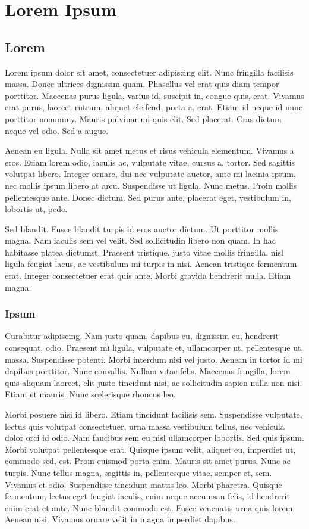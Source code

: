 \chapter{Lorem Ipsum}

\section{Lorem}

Lorem ipsum dolor sit amet, consectetuer adipiscing elit. Nunc fringilla facilisis massa. Donec
ultrices dignissim quam. Phasellus vel erat quis diam tempor porttitor. Maecenas purus ligula,
varius id, suscipit in, congue quis, erat. Vivamus erat purus, laoreet rutrum, aliquet eleifend,
porta a, erat. Etiam id neque id nunc porttitor nonummy. Mauris pulvinar mi quis elit. Sed placerat.
Cras dictum neque vel odio. Sed a augue.

Aenean eu ligula. Nulla sit amet metus et risus vehicula elementum. Vivamus a eros. Etiam lorem
odio, iaculis ac, vulputate vitae, cursus a, tortor. Sed sagittis volutpat libero. Integer ornare,
dui nec vulputate auctor, ante mi lacinia ipsum, nec mollis ipsum libero at arcu. Suspendisse ut
ligula. Nunc metus. Proin mollis pellentesque ante. Donec dictum. Sed purus ante, placerat eget,
vestibulum in, lobortis ut, pede.

Sed blandit. Fusce blandit turpis id eros auctor dictum. Ut porttitor mollis magna. Nam iaculis sem
vel velit. Sed sollicitudin libero non quam. In hac habitasse platea dictumst. Praesent tristique,
justo vitae mollis fringilla, nisl ligula feugiat lacus, ac vestibulum mi turpis in nisi. Aenean
tristique fermentum erat. Integer consectetuer erat quis ante. Morbi gravida hendrerit nulla. Etiam
magna.

\subsection{Ipsum}

Curabitur adipiscing. Nam justo quam, dapibus eu, dignissim eu, hendrerit consequat, odio. Praesent
mi ligula, vulputate et, ullamcorper ut, pellentesque ut, massa. Suspendisse potenti. Morbi interdum
nisi vel justo. Aenean in tortor id mi dapibus porttitor. Nunc convallis. Nullam vitae felis.
Maecenas fringilla, lorem quis aliquam laoreet, elit justo tincidunt nisi, ac sollicitudin sapien
nulla non nisi. Etiam et mauris. Nunc scelerisque rhoncus leo.

Morbi posuere nisi id libero. Etiam tincidunt facilisis sem. Suspendisse vulputate, lectus quis
volutpat consectetuer, urna massa vestibulum tellus, nec vehicula dolor orci id odio. Nam faucibus
sem eu nisl ullamcorper lobortis. Sed quis ipsum. Morbi volutpat pellentesque erat. Quisque ipsum
velit, aliquet eu, imperdiet ut, commodo sed, est. Proin euismod porta enim. Mauris sit amet purus.
Nunc ac turpis. Nunc tellus magna, sagittis in, pellentesque vitae, semper et, sem. Vivamus et odio.
Suspendisse tincidunt mattis leo. Morbi pharetra. Quisque fermentum, lectus eget feugiat iaculis,
enim neque accumsan felis, id hendrerit enim erat et ante. Nunc blandit commodo est. Fusce venenatis
urna quis lorem. Aenean nisi. Vivamus ornare velit in magna imperdiet dapibus.

